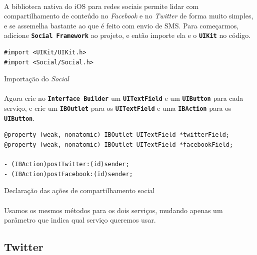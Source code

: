 \documentclass[a4paper,12pt,brazil,doubleside]{book}
\begin{document}
\begin{singlespace}
\paragraph{}A biblioteca nativa do iOS para redes sociais permite lidar com compartilhamento de conteúdo no \emph{Facebook} e no \emph{Twitter} de forma muito simples, e se assemelha bastante ao que é feito com envio de SMS. Para começarmos, adicione \texttt{\textbf{Social Framework}} ao projeto, e então importe ela e o \texttt{\textbf{UIKit}} no código.

\begin{listing}[H]
\begin{verbatim}
#import <UIKit/UIKit.h>
#import <Social/Social.h>
\end{verbatim}
\caption{Importação do \emph{Social}}
\end{listing}

\paragraph{}Agora crie no \texttt{\textbf{Interface Builder}} um \texttt{\textbf{UITextField}} e um \texttt{\textbf{UIButton}} para cada serviço, e crie um \texttt{\textbf{IBOutlet}} para os \texttt{\textbf{UITextField}} e uma \texttt{\textbf{IBAction}} para os \texttt{\textbf{UIButton}}.

\begin{listing}[H]
\begin{verbatim}
@property (weak, nonatomic) IBOutlet UITextField *twitterField;
@property (weak, nonatomic) IBOutlet UITextField *facebookField;

- (IBAction)postTwitter:(id)sender;
- (IBAction)postFacebook:(id)sender;
\end{verbatim}
\caption{Declaração das ações de compartilhamento social}
\end{listing}

\paragraph{}Usamos os mesmos métodos para os dois serviços, mudando apenas um parâmetro que indica qual serviço queremos usar.

\bigskip

\subsection{Twitter}


\end{singlespace}
\end{document}
